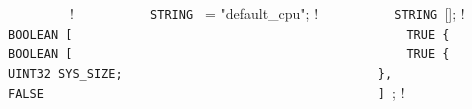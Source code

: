 {{%
\lstinline!        !\quad \quad{} {              ! \newline
\lstinline!          STRING ! = "default_cpu";    ! \newline
\lstinline!          STRING ![];             ! \newline
\lstinline!                                                     ! \newline
\lstinline!          BOOLEAN [                                  ! \newline
\lstinline!            TRUE {                                   ! \newline
\lstinline!              BOOLEAN [                              ! \newline
\lstinline!                TRUE {                               ! \newline
\lstinline!                  UINT32 SYS_SIZE;                   ! \newline
\lstinline!                },                                   ! \newline
\lstinline!                FALSE                                ! \newline
\lstinline!              ] !;              ! \newline
}}}
